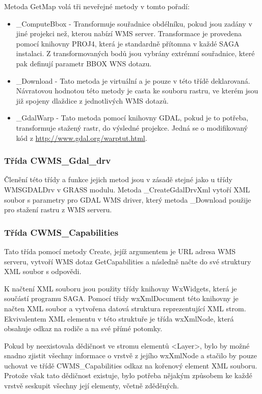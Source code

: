 \documentclass[a4paper,12pt]{article}
\begin{document}
Metoda GetMap volá tři neveřejné metody v tomto pořadí:
\begin{itemize}
 \item \_ComputeBbox - Transformuje souřadnice obdélníku, pokud jsou zadány v jiné projekci než, kterou nabízí WMS server. Transformace je provedena pomocí knihovny PROJ4, která je standardně přítomna v každé SAGA instalaci. Z transformovaných bodů jsou vybrány extrémní souřadnice, které pak definují parametr BBOX WNS dotazu. 
 \item \_Download - Tato metoda je virtuální a je pouze v této třídě deklarovaná. 
 Návratovou hodnotou této metody je casta ke souboru rastru, ve kterém jsou již spojeny dlaždice z jednotlivých WMS dotazů.
 \item \_GdalWarp - Tato metoda pomocí knihovny GDAL, pokud je to potřeba, transformuje stažený rastr, do výsledné projekce. Jedná se o modifikovaný kód z \url{http://www.gdal.org/warptut.html}.
\end{itemize}

\subsubsection{Třída CWMS\_Gdal\_drv}

Členění této třídy a funkce jejich metod jsou v zásadě stejné jako u třídy WMSGDALDrv v GRASS modulu. Metoda \_CreateGdalDrvXml vytoří XML soubor s parametry pro GDAL WMS driver, 
který metoda  \_Download použije pro stažení rastru z WMS serveru. 


\subsubsection{Třída CWMS\_Capabilities}

Tato  třída pomocí metody Create, jejíž argumentem je URL adresa WMS serveru, vytvoří WMS dotaz GetCapabilities a následně načte do své struktury XML soubor s odpovědi.

K načtení XML souboru jsou použity třídy knihovny WxWidgets, která je součástí programu SAGA. Pomocí třidy wxXmlDocument této knihovny je načten XML soubor a vytvořena datová struktura reprezentující XML strom. Ekvivalentem XML elementu v této struktuře je třída wxXmlNode, která obsahuje odkaz na rodiče a na své přímé potomky. 

Pokud by neexistovala dědičnost ve stromu elementů <Layer>, bylo by možné snadno zjistit všechny informace o vrstvě z jejího wxXmlNode a stačilo by pouze uchovat ve třídě CWMS\_Capabilities odkaz na kořenový element XML souboru. Protože však tato dědičnost existuje, bylo potřeba nějakým způsobem ke každé vrstvě seskupit všechny její elementy, včetně zděděných. 
  
\end{document}
